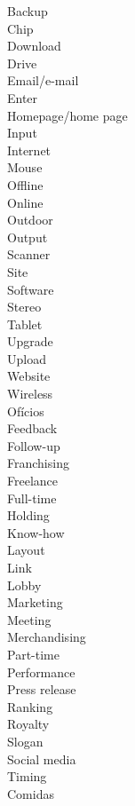 \documentclass[12pt,a4paper]{article} %
\begin{document}
		Backup\\
		Chip\\
		Download\\
		Drive\\
		Email/e-mail\\
		Enter\\
		Homepage/home page\\
		Input\\
		Internet\\
		Mouse\\
		Offline\\
		Online\\
		Outdoor\\
		Output\\
		Scanner\\ 
		Site\\
		Software\\
		Stereo\\
		Tablet\\
		Upgrade\\
		Upload\\
		Website\\
		Wireless\\

	Ofícios\\
		
		Feedback\\
		Follow-up\\
		Franchising\\
		Freelance\\
		Full-time\\
		Holding\\
		Know-how\\
		Layout\\
		Link\\
		Lobby\\
		Marketing\\
		Meeting\\
		Merchandising\\
		Part-time\\
		Performance\\
		Press release\\
		Ranking\\
		Royalty\\
		Slogan\\
		Social media\\
		Timing\\

	Comidas\\
		
\end{document}
